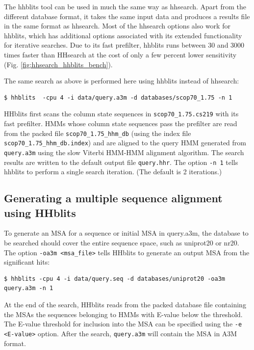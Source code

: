\documentclass[11pt,a4paper]{article}
\begin{document}
The hhblits tool can be used in much the same way as hhsearch. 
Apart from the different database format, it takes the same input data and produces a results file in 
the same format as hhsearch. Most of the hhsearch options also work for hhblits, which has
additional options associated with its extended functionality for iterative searches. 
Due to its fast prefilter, hhblits runs between 30 and 3000 times faster than HHsearch
at the cost of only a few percent lower sensitivity (Fig. \ref{fig:hhsearch_hhblits_bench}).

The same search as above is performed here using hhblits instead of hhsearch:
\begin{verbatim}
$ hhblits  -cpu 4 -i data/query.a3m -d databases/scop70_1.75 -n 1
\end{verbatim}

HHblits first scans the column state sequences in \verb`scop70_1.75.cs219` with its fast prefilter. HMMs whose column state sequences pass the prefilter are read from the packed file \verb`scop70_1.75_hhm_db` (using the index file \verb`scop70_1.75_hhm_db.index`) and are aligned to the query HMM generated from \verb`query.a3m` using the slow Viterbi HMM-HMM alignment algorithm. The search results are written to the default output file \verb`query.hhr`. The option \verb`-n 1` tells hhblits to perform a single search iteration. (The default is 2 iterations.)


\subsection{Generating a multiple sequence alignment using HHblits}\label{msa_hhblits}

To generate an MSA for a sequence or initial MSA in query.a3m, the database to be searched should cover the entire sequence space, such as uniprot20 or nr20. The option \verb`-oa3m <msa_file>` tells HHblits to generate an output MSA from the significant hits:
\begin{verbatim}
$ hhblits -cpu 4 -i data/query.seq -d databases/uniprot20 -oa3m query.a3m -n 1
\end{verbatim}

At the end of the search, HHblits reads from the packed database file containing the MSAs the sequences belonging to HMMs with E-value below the threshold. The E-value threshold for inclusion into the MSA can be specified using the \verb`-e <E-value>` option. After the search, \verb`query.a3m` will contain the MSA in A3M format. 
\end{document}
